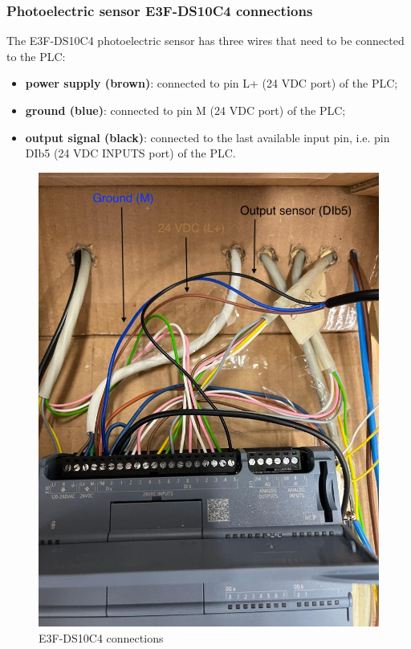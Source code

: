 \documentclass[a4paper,11pt]{report}
\theoremstyle{definition}
\theoremstyle{plain}
\begin{document}
            \subsubsection{Photoelectric sensor E3F-DS10C4 connections}
                The E3F-DS10C4 photoelectric sensor has three wires that need to be connected to the PLC:
                \begin{itemize}
                    \item \textbf{power supply (brown)}: connected to pin L+ (24 VDC port) of the PLC;
                    \item \textbf{ground (blue)}: connected to pin M (24 VDC port) of the PLC;
                    \item \textbf{output signal (black)}: connected to the last available input pin, i.e. pin DIb5 (24 VDC INPUTS port) of the PLC.
                \end{itemize}
                \begin{figure}[H]
                    \centering
                    \includegraphics[scale=0.35]{images/sensorconn.jpeg}
                    \caption{E3F-DS10C4 connections}
                \end{figure} 
\end{document}
